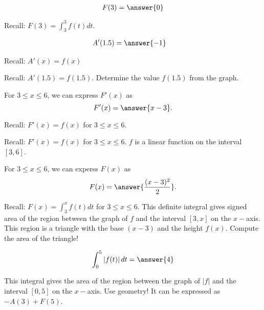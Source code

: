 \documentclass{ximera}
\begin{document}
\begin{exercise}
\begin{align*}
F(3) &= \answer{0}\\
\end{align*}
\begin{hint}
Recall: $F(3)= \int_3^3 f(t) dt $.
\end{hint}
\begin{align*}
A'(1.5) &= \answer{-1}
\end{align*}
\begin{hint}
Recall: $A'(x)=f(x)$
\end{hint}
\begin{hint}
Recall: $A'(1.5)=f(1.5)$. Determine the value $f(1.5)$ from the graph.
\end{hint}
For $3\leq x\leq6$, we can express $F'(x)$ as
\[
F'(x) = \answer{x-3}.
\]
\begin{hint}
Recall: $F'(x)=f(x)$ for  $3\leq x\leq6$.
\end{hint}
\begin{hint}
Recall: $F'(x)=f(x)$ for  $3\leq x\leq6$. $f$ is a linear function on the interval $[3,6]$.
\end{hint}
For $3\leq x\leq6$, we can experss $F(x)$ as
\[
F(x) = \answer{\frac{(x-3)^2}{2}}.
\]
\begin{hint}
Recall: $F(x)= \int_3^x f(t) dt$ for  $3\leq x\leq6$.  This definite integral gives signed area of the region between the graph of $f$ and the interval $[3,x]$ on the $x-$axis.
This region is a triangle with the base $(x-3)$ and the height $f(x)$. Compute the area of the triangle!
\end{hint}
\[
\int_0^5\left|f(t)\right| dt = \answer{4}
\]
\begin{hint}
This integral gives the area of the region between the graph of $|f|$ and the interval $[0,5]$ on the $x-$axis. Use geometry! 
It can be expressed as $-A(3)+F(5)$.
\end{hint}
\end{exercise}
\end{document}
